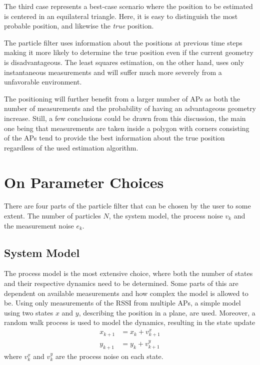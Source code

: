 \documentclass{LTHthesis}
\begin{document}
The third case represents a best-case scenario where the position to be estimated is centered in an equilateral triangle. Here, it is easy to distinguish the most probable position, and likewise the \emph{true} position.

The particle filter uses information about the positions at previous time steps making it more likely to determine the true position even if the current geometry is disadvantageous. The least squares estimation, on the other hand, uses only instantaneous measurements and will suffer much more severely from a unfavorable environment. 
 
The positioning will further benefit from a larger number of APs as both the number of measurements and the probability of having an advantageous geometry increase. Still, a few conclusions could be drawn from this discussion, the main one being that measurements are taken inside a polygon with corners consisting of the APs tend to provide the best information about the true position regardless of the used estimation algorithm. 
%
\section{On Parameter Choices}
%
There are four parts of the particle filter that can be chosen by the user to some extent. The number of particles $N$, the system model, the process noise $v_k$ and the measurement noise $e_k$.
%
\subsection{System Model}
%
The process model is the most extensive choice, where both the number of states and their respective dynamics need to be determined. Some parts of this are dependent on available measurements and how complex the model is allowed to be. Using only measurements of the RSSI from multiple APs, a simple model using two states $x$ and $y$, describing the position in a plane, are used. Moreover, a random walk process is used to model the dynamics, resulting in the state update
%
\begin{eqnarray}
x_{k+1}&=x_k + v^x_{k+1} \\
y_{k+1}&=y_k + v^y_{k+1} 
\end{eqnarray}
%
where $v^x_k$ and $v^y_k$ are the process noise on each state. 
%
\end{document}
